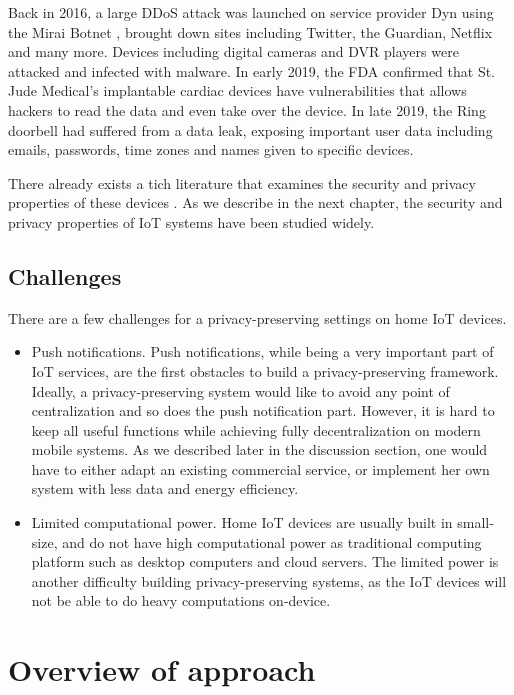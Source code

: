 Back in 2016, a large DDoS attack was launched on service provider Dyn using the Mirai Botnet \cite{antonakakis2017understanding}, brought down sites including Twitter, the Guardian, Netflix and many more. Devices including digital cameras and DVR players were attacked and infected with malware. In early 2019, the FDA confirmed that St. Jude Medical's implantable cardiac devices have vulnerabilities that allows hackers to read the data and even take over the device. In late 2019, the Ring doorbell had suffered from a data leak, exposing important user data including emails, passwords, time zones and names given to specific devices.

There already exists a tich literature that examines the security and privacy properties of these devices \cite{acar2016sok} \cite{hilt2019internet} \cite{shumailov2019hearing} \cite{apthorpe2017smart}. As we describe in the next chapter, the security and privacy properties of IoT systems have been studied widely.


\subsection{Challenges}

There are a few challenges for a privacy-preserving settings on home IoT devices. 

\begin{itemize}
	\item Push notifications. Push notifications, while being a very important part of IoT services, are the first obstacles to build a privacy-preserving framework. Ideally, a privacy-preserving system would like to avoid any point of centralization and so does the push notification part. However, it is hard to keep all useful functions while achieving fully decentralization on modern mobile systems. As we described later in the discussion section, one would have to either adapt an existing commercial service, or implement her own system with less data and energy efficiency.
	\item Limited computational power. Home IoT devices are usually built in small-size, and do not have high computational power as traditional computing platform such as desktop computers and cloud servers. The limited power is another difficulty building privacy-preserving systems, as the IoT devices will not be able to do heavy computations on-device.
\end{itemize}

\section{Overview of approach}

